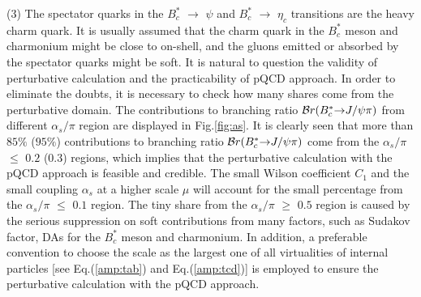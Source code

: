 \documentclass[preprint,superscriptaddress,nofootinbib]{revtex4}
\begin{document}
  (3) The spectator quarks in the $B_{c}^{\ast}$ ${\to}$ ${\psi}$ and
  $B_{c}^{\ast}$ ${\to}$ ${\eta}_{c}$ transitions are the heavy charm quark.
  It is usually assumed that
  the charm quark in the $B_{c}^{\ast}$ meson and charmonium might be close to on-shell,
  and the gluons emitted or absorbed by the spectator quarks might be soft.
  It is natural to question the validity of perturbative calculation and
  the practicability of pQCD approach.
  In order to eliminate the doubts, it is necessary to check how many shares come
  from the perturbative domain.
  The contributions to branching ratio ${\cal B}r(B_{c}^{\ast}{\to}J/{\psi}{\pi})$
  from different ${\alpha}_{s}/{\pi}$ region are displayed in Fig.\ref{fig:as}.
  It is clearly seen that more than $85\%$ ($95\%$) contributions to branching
  ratio ${\cal B}r(B_{c}^{\ast}{\to}J/{\psi}{\pi})$ come from the ${\alpha}_{s}/{\pi}$
  ${\le}$ $0.2$ ($0.3$) regions, which implies that the perturbative calculation
  with the pQCD approach is feasible and credible.
  The small Wilson coefficient $C_{1}$ and the small coupling ${\alpha}_{s}$
  at a higher scale ${\mu}$ will account for the small percentage from the
  ${\alpha}_{s}/{\pi}$ ${\le}$ $0.1$ region.
  The tiny share from the ${\alpha}_{s}/{\pi}$ ${\ge}$ $0.5$ region is caused
  by the serious suppression on soft contributions from many factors, such as
  Sudakov factor, DAs for the $B_{c}^{\ast}$ meson and charmonium.
  In addition, a preferable convention to choose the scale as the largest one
  of all virtualities of internal particles [see Eq.(\ref{amp:tab}) and
  Eq.(\ref{amp:tcd})] is employed to ensure the perturbative calculation
  with the pQCD approach.
\end{document}
